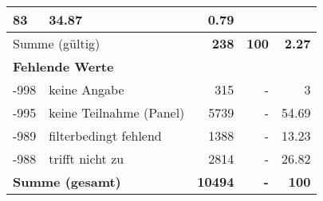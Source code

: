 \begin{longtable}{lXrrr}
       \num{83} &
       \num[round-mode=places,round-precision=2]{34.87} &
         \num[round-mode=places,round-precision=2]{0.79} \\
     \midrule
     \multicolumn{2}{l}{Summe (gültig)} &
       \textbf{\num{238}} &
     \textbf{\num{100}} &
       \textbf{\num[round-mode=places,round-precision=2]{2.27}} \\
     \multicolumn{5}{l}{\textbf{Fehlende Werte}}\\
       -998 &
       keine Angabe &
         \num{315} &
        - &
         \num[round-mode=places,round-precision=2]{3} \\
       -995 &
       keine Teilnahme (Panel) &
         \num{5739} &
        - &
         \num[round-mode=places,round-precision=2]{54.69} \\
       -989 &
       filterbedingt fehlend &
         \num{1388} &
        - &
         \num[round-mode=places,round-precision=2]{13.23} \\
       -988 &
       trifft nicht zu &
         \num{2814} &
        - &
         \num[round-mode=places,round-precision=2]{26.82} \\
     \midrule
     \multicolumn{2}{l}{\textbf{Summe (gesamt)}} &
          \textbf{\num{10494}} &
        \textbf{-} &
        \textbf{\num{100}} \\
     \bottomrule
     \end{longtable}
     
